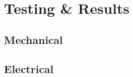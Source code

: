\chapter{Testing \& Results}
\thispagestyle{fancy}


\section{Mechanical}
\blindtext


\section{Electrical}
\blindtext
